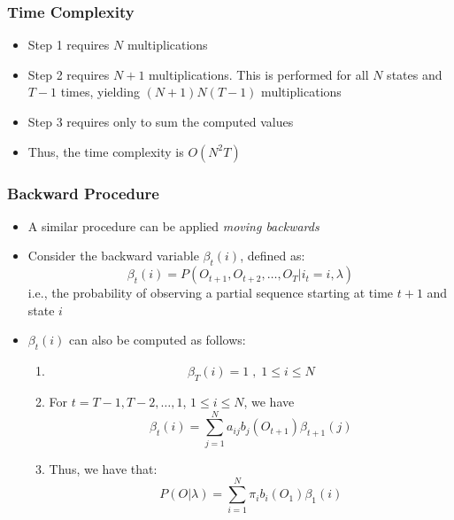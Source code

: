 \documentclass{beamer}
\begin{document}

\begin{frame} \frametitle{Time Complexity}

  \begin{itemize}
  \item Step 1 requires $N$ multiplications
  \item Step 2 requires $N+1$ multiplications. This is performed for all $N$
    states and $T-1$ times, yielding $(N+1)N(T-1)$ multiplications
  \item Step 3 requires only to sum the computed values
  \item Thus, the time complexity is \emph{$O(N^2T)$}
  \end{itemize}
  
\end{frame}


\begin{frame} \frametitle{Backward Procedure}

  \begin{itemize}
  \item A similar procedure can be applied \textit{moving backwards}
  \item Consider the backward variable $\beta_t(i)$, defined as:
    \begin{displaymath}
      \beta_t(i) = P(O_{t+1}, O_{t+2}, \dotsc, O_T|i_t = i, \lambda)
    \end{displaymath}
    i.e., the probability of observing a partial sequence starting at time
    $t+1$ and state $i$
  \item $\beta_t(i)$ can also be computed as follows:
    \begin{enumerate}
    \item
      \begin{displaymath}
        \beta_T(i) = 1 \; , \; 1 \leq i \leq N
      \end{displaymath}
    \item For $t = T-1, T-2, \dotsc, 1$, $1 \leq i \leq N$, we have
      \begin{displaymath}
        \beta_t(i) = \sum_{j=1}^N a_{ij}b_j(O_{t+1})\beta_{t+1}(j)
      \end{displaymath}
    \item Thus, we have that:
      \begin{displaymath}
        P(O|\lambda) = \sum_{i=1}^N \pi_ib_i(O_1)\beta_1(i)
      \end{displaymath}
    \end{enumerate}
  \end{itemize}
  
\end{frame}
\end{document}
